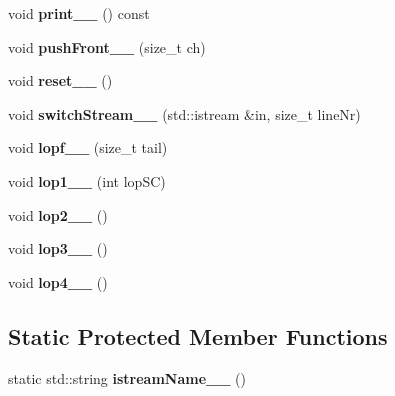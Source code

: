 \begin{DoxyCompactItemize}
\item 
\hypertarget{classScannerBase_a9f3016ad3dd153084338996814517860}{void {\bfseries print\+\_\+\+\_\+} () const }\label{classScannerBase_a9f3016ad3dd153084338996814517860}

\item 
\hypertarget{classScannerBase_a93bc4ebf1066dcc078f92ca46c2ac06c}{void {\bfseries push\+Front\+\_\+\+\_\+} (size\+\_\+t ch)}\label{classScannerBase_a93bc4ebf1066dcc078f92ca46c2ac06c}

\item 
\hypertarget{classScannerBase_a68143fa375f40372a20a341fbd29add8}{void {\bfseries reset\+\_\+\+\_\+} ()}\label{classScannerBase_a68143fa375f40372a20a341fbd29add8}

\item 
\hypertarget{classScannerBase_ae47bc161d7895da37aae6365b4c8cef7}{void {\bfseries switch\+Stream\+\_\+\+\_\+} (std\+::istream \&in, size\+\_\+t line\+Nr)}\label{classScannerBase_ae47bc161d7895da37aae6365b4c8cef7}

\item 
\hypertarget{classScannerBase_a9635171f8d89e43eaa6bb035e302e2a3}{void {\bfseries lopf\+\_\+\+\_\+} (size\+\_\+t tail)}\label{classScannerBase_a9635171f8d89e43eaa6bb035e302e2a3}

\item 
\hypertarget{classScannerBase_a7002587b47a5f2d1e4be6a530c7076a7}{void {\bfseries lop1\+\_\+\+\_\+} (int lop\+S\+C)}\label{classScannerBase_a7002587b47a5f2d1e4be6a530c7076a7}

\item 
\hypertarget{classScannerBase_a93a25cf1505db9a9a0f3dd4fb9a40c51}{void {\bfseries lop2\+\_\+\+\_\+} ()}\label{classScannerBase_a93a25cf1505db9a9a0f3dd4fb9a40c51}

\item 
\hypertarget{classScannerBase_a812266cffb3ddd6f1ff64d2ee8151e78}{void {\bfseries lop3\+\_\+\+\_\+} ()}\label{classScannerBase_a812266cffb3ddd6f1ff64d2ee8151e78}

\item 
\hypertarget{classScannerBase_abf3fb2a9582ea160dd19439667997a95}{void {\bfseries lop4\+\_\+\+\_\+} ()}\label{classScannerBase_abf3fb2a9582ea160dd19439667997a95}

\end{DoxyCompactItemize}
\subsection*{Static Protected Member Functions}
\begin{DoxyCompactItemize}
\item 
\hypertarget{classScannerBase_a9dcc3f8c186983bc1ea3d7541e231c8b}{static std\+::string {\bfseries istream\+Name\+\_\+\+\_\+} ()}\label{classScannerBase_a9dcc3f8c186983bc1ea3d7541e231c8b}

\end{DoxyCompactItemize}
